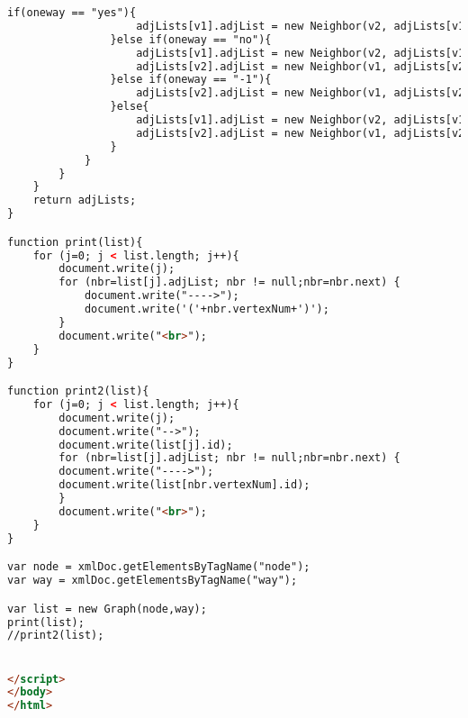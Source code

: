 \begin{lstlisting}[language=HTML,basicstyle=\tiny,caption=list.html]
				if(oneway == "yes"){
					adjLists[v1].adjList = new Neighbor(v2, adjLists[v1].adjList,distance);
				}else if(oneway == "no"){
					adjLists[v1].adjList = new Neighbor(v2, adjLists[v1].adjList,distance);
					adjLists[v2].adjList = new Neighbor(v1, adjLists[v2].adjList,distance);
				}else if(oneway == "-1"){
					adjLists[v2].adjList = new Neighbor(v1, adjLists[v2].adjList,distance);
				}else{
					adjLists[v1].adjList = new Neighbor(v2, adjLists[v1].adjList,distance);
					adjLists[v2].adjList = new Neighbor(v1, adjLists[v2].adjList,distance);
				}	
			}
		}
	}	
	return adjLists;
}

function print(list){
	for (j=0; j < list.length; j++){
		document.write(j);
		for (nbr=list[j].adjList; nbr != null;nbr=nbr.next) {
			document.write("---->");
			document.write('('+nbr.vertexNum+')');
		}
		document.write("<br>");
	}
}

function print2(list){
	for (j=0; j < list.length; j++){
		document.write(j);
		document.write("-->");
		document.write(list[j].id);
		for (nbr=list[j].adjList; nbr != null;nbr=nbr.next) {
		document.write("---->");
		document.write(list[nbr.vertexNum].id);
		}
		document.write("<br>");
	}
}

var node = xmlDoc.getElementsByTagName("node");
var way = xmlDoc.getElementsByTagName("way");

var list = new Graph(node,way);
print(list);
//print2(list);


</script>
</body>
</html> 
\end{lstlisting}

